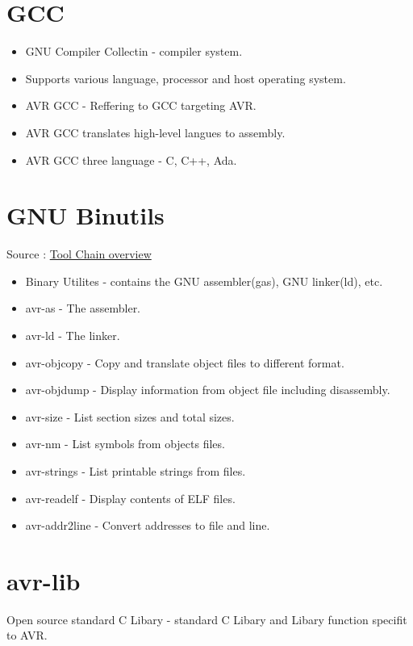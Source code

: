 \documentclass{article}
\begin{document}
\section{GCC}
\begin{itemize}
    \item GNU Compiler Collectin - compiler system.
    \item Supports various language, processor and host operating system.
    \item AVR GCC - Reffering to GCC targeting AVR.
    \item AVR GCC translates high-level langues to assembly.
    \item AVR GCC three language - C, C++, Ada.
\end{itemize}

\section{GNU Binutils} 
Source : \href{https://www.nongnu.org/avr-libc/user-manual/overview.html}{Tool Chain overview}
\begin{itemize}
    \item Binary Utilites - contains the GNU assembler(gas), GNU linker(ld), etc.
    \item avr-as - The assembler.
    \item avr-ld - The linker.
    \item avr-objcopy - Copy and translate object files to different format.
    \item avr-objdump - Display information from object file including disassembly.
    \item avr-size - List section sizes and total sizes.
    \item avr-nm - List symbols from objects files.
    \item avr-strings - List printable strings from files.
    \item avr-readelf - Display contents of ELF files.
    \item avr-addr2line - Convert addresses to file and line.
\end{itemize}

\section{avr-lib}
\quad Open source standard C Libary - standard C Libary and Libary function specifit to AVR.
\end{document}
